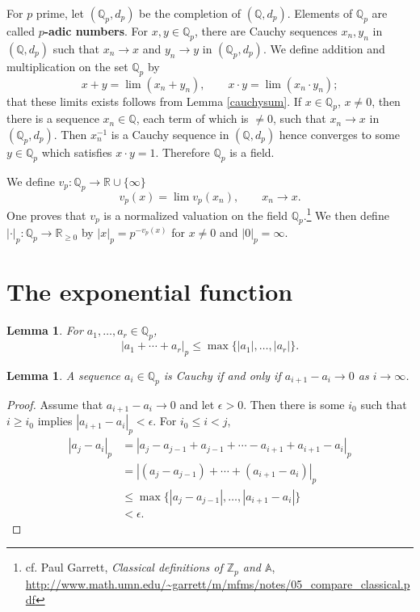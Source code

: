 \documentclass{article}
\newtheorem{lemma}[theorem]{Lemma}
\theoremstyle{definition}
\begin{document}
For $p$ prime, let $(\mathbb{Q}_p,d_p)$ be the completion of $(\mathbb{Q},d_p)$. Elements
of $\mathbb{Q}_p$ are called \textbf{$p$-adic numbers}.
For $x,y \in \mathbb{Q}_p$, there are Cauchy sequences $x_n,y_n$ in $(\mathbb{Q},d_p)$ such that
$x_n \to x$ and $y_n \to y$ in $(\mathbb{Q}_p,d_p)$. 
We define addition and multiplication on the set $\mathbb{Q}_p$ by
\[
x+y = \lim (x_n+y_n), \qquad x\cdot y= \lim (x_n\cdot y_n);
\]
that these limits exists follows from Lemma \ref{cauchysum}. 
If $x \in \mathbb{Q}_p$, $x \neq 0$, then there is a sequence $x_n \in \mathbb{Q}$, each term of which is $\neq 0$, 
such that $x_n \to x$ in $(\mathbb{Q}_p,d_p)$. 
Then $x_n^{-1}$ is a Cauchy sequence in $(\mathbb{Q},d_p)$ hence converges to some $y \in \mathbb{Q}_p$ which
satisfies $x\cdot y =1$. Therefore $\mathbb{Q}_p$ is a field. 

We define $v_p:\mathbb{Q}_p \to \mathbb{R} \cup \{\infty\}$ 
\[
v_p(x) = \lim v_p(x_n), \qquad x_n \to x.
\]
One proves that $v_p$ is a normalized valuation on the field $\mathbb{Q}_p$.\footnote{cf. Paul Garrett, {\em Classical definitions of $\mathbb{Z}_p$ and $\mathbb{A}$},
\url{http://www.math.umn.edu/~garrett/m/mfms/notes/05_compare_classical.pdf}}
We then 
define $|\cdot|_p:\mathbb{Q}_p \to \mathbb{R}_{\geq 0}$ by
$|x|_p=p^{-v_p(x)}$ for $x \neq 0$ and $|0|_p=\infty$. 



\section{The exponential function}
\begin{lemma}
For $a_1,\ldots,a_r \in \mathbb{Q}_p$,
\[
|a_1+\cdots+a_r|_p \leq \max\{|a_1|,\ldots,|a_r|\}.
\]
\end{lemma}

\begin{lemma}
A sequence $a_i \in \mathbb{Q}_p$ is Cauchy if and only if $a_{i+1}-a_i \to 0$ as $i \to \infty$.
\end{lemma}
\begin{proof}
Assume that $a_{i+1}-a_i \to 0$ and let $\epsilon>0$. Then there is some $i_0$ such that $i \geq i_0$ implies
$|a_{i+1}-a_i|_p < \epsilon$. For $i_0 \leq i < j$,
\begin{align*}
|a_j-a_i|_p&=|a_j-a_{j-1}+a_{j-1}+\cdots-a_{i+1}+a_{i+1}-a_i|_p\\
&=|(a_j-a_{j-1})+\cdots+(a_{i+1}-a_i)|_p\\
&\leq \max\{|a_j-a_{j-1}|,\ldots,|a_{i+1}-a_i|\}\\
&<\epsilon.
\end{align*}
\end{proof}
\end{document}
